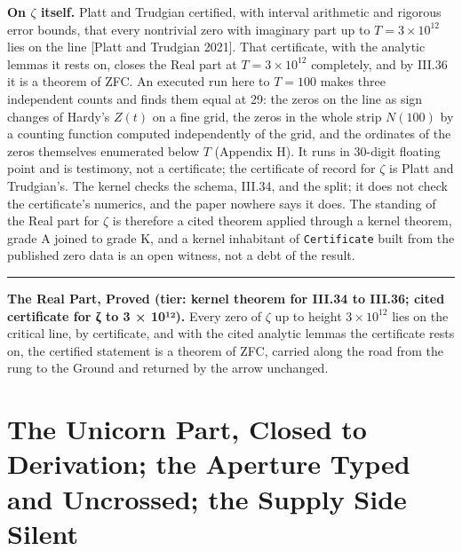 \documentclass[10pt,twocolumn]{article}
\newcommand{\jboxstart}{\begin{jbox}}
\newcommand{\jboxend}{\end{jbox}}
\newenvironment{jbox}{\par\vspace{2pt}\noindent\color{accent}\rule{\columnwidth}{0.8pt}\par\vspace{-2pt}\small}{\par\vspace{2pt}}
\begin{document}
\textbf{On \(\zeta\) itself.} Platt and Trudgian certified, with
interval arithmetic and rigorous error bounds, that every nontrivial
zero with imaginary part up to \(T = 3 \times 10^{12}\) lies on the line
{[}Platt and Trudgian 2021{]}. That certificate, with the analytic
lemmas it rests on, closes the Real part at \(T = 3 \times 10^{12}\)
completely, and by III.36 it is a theorem of ZFC. An executed run here
to \(T = 100\) makes three independent counts and finds them equal at
29: the zeros on the line as sign changes of Hardy's \(Z(t)\) on a fine
grid, the zeros in the whole strip \(N(100)\) by a counting function
computed independently of the grid, and the ordinates of the zeros
themselves enumerated below \(T\) (Appendix H). It runs in 30-digit
floating point and is testimony, not a certificate; the certificate of
record for \(\zeta\) is Platt and Trudgian's. The kernel checks the
schema, III.34, and the split; it does not check the certificate's
numerics, and the paper nowhere says it does. The standing of the Real
part for \(\zeta\) is therefore a cited theorem applied through a kernel
theorem, grade A joined to grade K, and a kernel inhabitant of
\texttt{Certificate} built from the published zero data is an open
witness, not a debt of the result.

\jboxstart

\textbf{The Real Part, Proved (tier: kernel theorem for III.34 to
III.36; cited certificate for ζ to 3 × 10¹²).} Every zero of \(\zeta\)
up to height \(3 \times 10^{12}\) lies on the critical line, by
certificate, and with the cited analytic lemmas the certificate rests
on, the certified statement is a theorem of ZFC, carried along the road
from the rung to the Ground and returned by the arrow unchanged.

\jboxend

\hypertarget{the-unicorn-part-closed-to-derivation-the-aperture-typed-and-uncrossed-the-supply-side-silent}{%
\section{The Unicorn Part, Closed to Derivation; the Aperture Typed and
Uncrossed; the Supply Side
Silent}\label{the-unicorn-part-closed-to-derivation-the-aperture-typed-and-uncrossed-the-supply-side-silent}}
\end{document}
